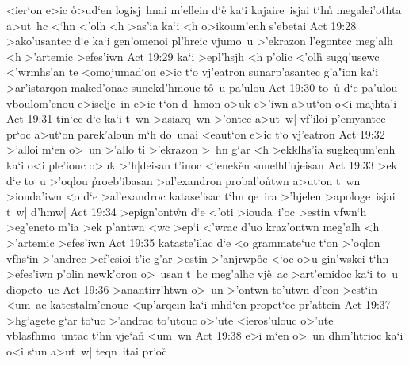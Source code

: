 <ier`on
e>ic
\r{o}>ud`en
logisj~hnai
m'ellein
d`e\r{}
ka`i
kajaire~isjai
t`hn\r{}
megalei'othta
a>ut~hc
<`hn
<'olh
<h
>as'ia
ka`i
<h
o>ikoum'enh
s'ebetai\bibvsend
\vs Act 19:28
>ako'usantec
d`e
ka`i
gen'omenoi
pl'hreic
vjumo~u
>'ekrazon
l'egontec
meg'alh
<h
>'artemic
>efes'iwn\bibvsend
\vs Act 19:29
ka`i
>epl'hsjh
<h
p'olic
<'ol\r{h}
sugq'usewc
<'wrmhs'an
te
<omojumad`on
e>ic
t`o
vj'eatron
sunarp'asantec
g'a"ion
ka`i
>ar'istarqon
maked'onac
sunekd'hmouc
t\r{o}~u
pa'ulou\bibvsend
\vs Act 19:30
to~u\r{}
d`e
pa'ulou
vboulom'enou
e>iselje~in
e>ic
t`on
d~hmon
o>uk
e>'iwn
a>ut`on
o<i
majhta'i\bibvsend
\vs Act 19:31
tin`ec
d`e
ka`i
t~wn
>asiarq~wn
>'ontec
a>ut~w|
vf'iloi
p'emyantec
pr`oc
a>ut`on
parek'aloun
m`h
do~unai
<eaut`on
e>ic
t`o
vj'eatron\bibvsend
\vs Act 19:32
>'alloi
m`en
o>~un
>'allo
ti
>'ekrazon
>~hn
g`ar
<h
>ekklhs'ia
sugkequm'enh
ka`i
o<i
ple'iouc
o>uk
>'h|deisan
t'inoc
<'enek\r{e}n
sunelhl'ujeisan\bibvsend
\vs Act 19:33
>ek
d`e
to~u
>'oqlou
\r{p}roeb'ibasan
>al'exandron
probal'o\r{n}twn
a>ut`on
t~wn
>iouda'iwn
<o
d`e
>al'exandroc
katase'isac
t`hn
qe~ira
>'hjelen
>apologe~isjai
t~w|
d'hmw|\bibvsend
\vs Act 19:34
>epign'ont\r{w}n
d`e
<'oti
>iouda~i'oc
>estin
vfwn`h
>eg'eneto
m'ia
>ek
p'antwn
<wc
>ep`i
<'wrac
d'uo
kraz'ontwn
meg'alh
<h
>'artemic
>efes'iwn\bibvsend
\vs Act 19:35
kataste'ilac
d`e
<o
grammate`uc
t`on
>'oqlon
vfhs`in
>'andrec
>ef'esioi
t'ic
g'ar
>estin
>'anjrwp\r{o}c
<`oc
o>u
gin'wskei
t`hn
>efes'iwn
p'olin
newk'oron
o>~usan
t~hc
meg'alhc
vj\r{e}~ac
>art'emidoc
ka`i
to~u
diopeto~uc\bibvsend
\vs Act 19:36
>anantirr'htwn
o>~un
>'ontwn
to'utwn
d'eon
>est`in
<um~ac
katestalm'enouc
<up'arqein
ka`i
mhd`en
propet`ec
pr'a\r{t}tein\bibvsend
{}
\vs Act 19:37
>hg'agete
g`ar
to`uc
>'andrac
to'utouc
o>'ute
<ieros'ulouc
o>'ute
vblasfhmo~untac
t`hn
vje`an\r{}
<um~wn\bibvsend
\vs Act 19:38
e>i
m`en
o>~un
dhm'htrioc
ka`i
o<i
s`un
a>ut~w|
teqn~itai
pr'oc\r{}
